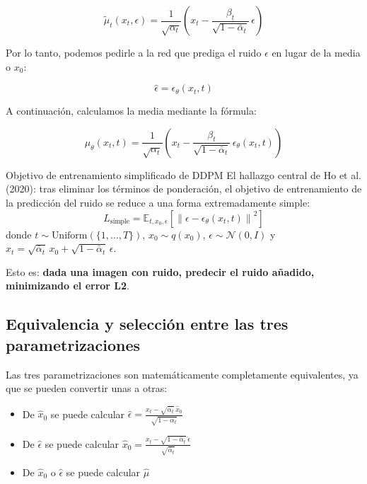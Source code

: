 \documentclass[a4paper]{article}
\begin{document}
$$\tilde{\mu}_t(x_t, \epsilon) = \frac{1}{\sqrt{\alpha_t}}\left(x_t - \frac{\beta_t}{\sqrt{1 - \bar{\alpha}_t}}\, \epsilon\right)$$

Por lo tanto, podemos pedirle a la red que prediga el ruido $\epsilon$ en lugar de la media o $x_0$:

$$\hat{\epsilon} = \epsilon_\theta(x_t, t)$$

A continuación, calculamos la media mediante la fórmula:

$$\mu_\theta(x_t, t) = \frac{1}{\sqrt{\alpha_t}}\left(x_t - \frac{\beta_t}{\sqrt{1 - \bar{\alpha}_t}}\, \epsilon_\theta(x_t, t)\right)$$

\begin{importantbox}{Objetivo de entrenamiento simplificado de DDPM}
El hallazgo central de Ho et al. (2020): tras eliminar los términos de ponderación, el objetivo de entrenamiento de la predicción del ruido se reduce a una forma extremadamente simple:
$$L_{\text{simple}} = \mathbb{E}_{t, x_0, \epsilon}\left[\left\| \epsilon - \epsilon_\theta(x_t, t) \right\|^2\right]$$
donde $t \sim \text{Uniform}(\{1, \dots, T\})$, $x_0 \sim q(x_0)$, $\epsilon \sim \mathcal{N}(0, I)$ y $x_t = \sqrt{\bar{\alpha}_t}\, x_0 + \sqrt{1 - \bar{\alpha}_t}\, \epsilon$.

Esto es: \textbf{dada una imagen con ruido, predecir el ruido añadido, minimizando el error L2}.
\end{importantbox}

\subsection{Equivalencia y selección entre las tres parametrizaciones}

Las tres parametrizaciones son matemáticamente completamente equivalentes, ya que se pueden convertir unas a otras:

\begin{itemize}
    \item De $\hat{x}_0$ se puede calcular $\hat{\epsilon} = \frac{x_t - \sqrt{\bar{\alpha}_t}\, \hat{x}_0}{\sqrt{1-\bar{\alpha}_t}}$
    \item De $\hat{\epsilon}$ se puede calcular $\hat{x}_0 = \frac{x_t - \sqrt{1-\bar{\alpha}_t}\, \hat{\epsilon}}{\sqrt{\bar{\alpha}_t}}$
    \item De $\hat{x}_0$ o $\hat{\epsilon}$ se puede calcular $\hat{\mu}$
\end{itemize}
\end{document}
